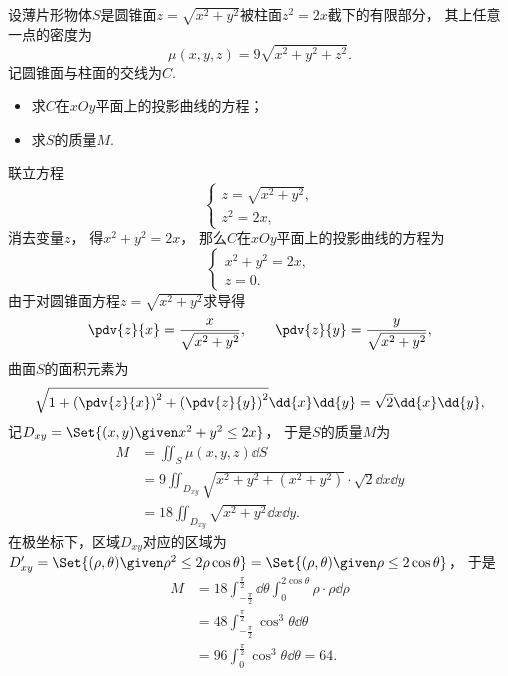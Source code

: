 \begin{example}
设薄片形物体\(S\)是圆锥面\(z=\sqrt{x^2+y^2}\)被柱面\(z^2=2x\)截下的有限部分，
其上任意一点的密度为\begin{equation*}
	\mu(x,y,z) = 9\sqrt{x^2+y^2+z^2}.
\end{equation*}
记圆锥面与柱面的交线为\(C\).
\begin{itemize}
	\item 求\(C\)在\(xOy\)平面上的投影曲线的方程；
	\item 求\(S\)的质量\(M\).
\end{itemize}
\begin{solution}
联立方程\begin{equation*}
	\begin{cases}
		z=\sqrt{x^2+y^2}, \\
		z^2=2x,
	\end{cases}
\end{equation*}
消去变量\(z\)，
得\(x^2+y^2=2x\)，
那么\(C\)在\(xOy\)平面上的投影曲线的方程为\begin{equation*}
	\begin{cases}
		x^2+y^2=2x, \\
		z=0.
	\end{cases}
\end{equation*}
由于对圆锥面方程\(z=\sqrt{x^2+y^2}\)求导得\begin{equation*}
	\pdv{z}{x} = \frac{x}{\sqrt{x^2+y^2}},
	\qquad
	\pdv{z}{y} = \frac{y}{\sqrt{x^2+y^2}},
\end{equation*}
曲面\(S\)的面积元素为\begin{equation*}
	\sqrt{1+\left( \pdv{z}{x} \right)^2+\left( \pdv{z}{y} \right)^2} \dd{x}\dd{y}
	= \sqrt2 \dd{x}\dd{y},
\end{equation*}
记\(D_{xy} = \Set{ (x,y) \given x^2+y^2\leq2x }\)，
于是\(S\)的质量\(M\)为\begin{align*}
	M &= \iint_S \mu(x,y,z) \dd{S} \\
	&= 9 \iint_{D_{xy}} \sqrt{x^2+y^2+(x^2+y^2)} \cdot \sqrt2 \dd{x}\dd{y} \\
	&= 18 \iint_{D_{xy}} \sqrt{x^2+y^2} \dd{x}\dd{y}.
\end{align*}
在极坐标下，区域\(D_{xy}\)对应的区域为
\(D_{xy}'
= \Set{ (\rho,\theta) \given \rho^2 \leq 2 \rho \cos\theta }
= \Set{ (\rho,\theta) \given \rho \leq 2 \cos\theta }\)，
于是\begin{align*}
	M &= 18 \int_{-\frac\pi2}^{\frac\pi2} \dd{\theta}
		\int_0^{2\cos\theta} \rho \cdot \rho \dd{\rho} \\
	&= 48 \int_{-\frac\pi2}^{\frac\pi2} \cos^3\theta \dd{\theta} \\
	&= 96 \int_0^{\frac\pi2} \cos^3\theta \dd{\theta}
	= 64.
\end{align*}
\end{solution}
\end{example}

